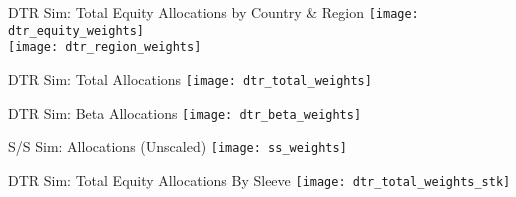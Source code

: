 \documentclass{beamer}
\begin{document}
\begin{frame}{DTR Sim: Total Equity Allocations by Country \& Region}
\texttt{[image: dtr\_equity\_weights]} \\
\texttt{[image: dtr\_region\_weights]}
\end{frame}

\begin{frame}{DTR Sim: Total Allocations}
\texttt{[image: dtr\_total\_weights]}
\end{frame}

\begin{frame}{DTR Sim: Beta Allocations}
\texttt{[image: dtr\_beta\_weights]}
\end{frame}

\begin{frame}{S/S Sim: Allocations (Unscaled)}
\texttt{[image: ss\_weights]}
\end{frame}

\begin{frame}{DTR Sim: Total Equity Allocations By Sleeve}
\texttt{[image: dtr\_total\_weights\_stk]}
\end{frame}
\end{document}
